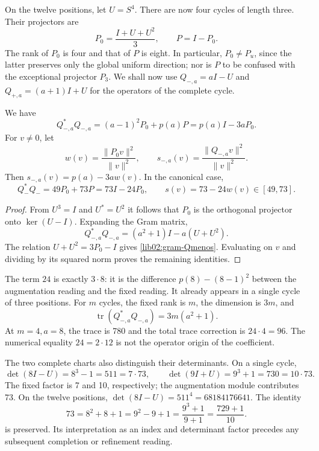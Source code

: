 On the twelve positions, let \(U=S^4\). There are now four cycles of length three. Their projectors are
\[
 P_0=\frac{I+U+U^2}{3},\qquad P=I-P_0.
\]
The rank of \(P_0\) is four and that of \(P\) is eight. In particular, \(P_0\ne P_u\), since the latter preserves only the global uniform direction; nor is \(P\) to be confused with the exceptional projector \(P_3\). We shall now use \(Q_{-,a}=aI-U\) and \(Q_{+,a}=(a+1)I+U\) for the operators of the complete cycle.

\begin{theorem}
\label{lib02:gram-ternario}
We have
\begin{equation}
 Q_{-,a}^*Q_{-,a}
 =(a-1)^2P_0+p(a)P=p(a)I-3aP_0.
 \label{lib02:gram-Qmenos}
\end{equation}
For \(v\ne0\), let
\[
 w(v)=\frac{\|P_0v\|^2}{\|v\|^2},\qquad
 s_{-,a}(v)=\frac{\|Q_{-,a}v\|^2}{\|v\|^2}.
\]
Then \(s_{-,a}(v)=p(a)-3aw(v)\). In the canonical case,
\begin{equation}
 Q_-^*Q_-=49P_0+73P=73I-24P_0,
 \qquad s(v)=73-24w(v)\in[49,73].
 \label{lib02:73-24w}
\end{equation}
\end{theorem}
\begin{proof}
From \(U^3=I\) and \(U^*=U^2\) it follows that \(P_0\) is the orthogonal projector onto \(\ker(U-I)\). Expanding the Gram matrix,
\[
 Q_{-,a}^*Q_{-,a}=(a^2+1)I-a(U+U^2).
\]
The relation \(U+U^2=3P_0-I\) gives \eqref{lib02:gram-Qmenos}. Evaluating on \(v\) and dividing by its squared norm proves the remaining identities.
\end{proof}

The term \(24\) is exactly \(3\cdot8\): it is the difference \(p(8)-(8-1)^2\) between the augmentation reading and the fixed reading. It already appears in a single cycle of three positions. For \(m\) cycles, the fixed rank is \(m\), the dimension is \(3m\), and
\[
 \operatorname{tr}(Q_{-,a}^*Q_{-,a})=3m(a^2+1).
\]
At \(m=4,a=8\), the trace is 780 and the total trace correction is \(24\cdot4=96\). The numerical equality \(24=2\cdot12\) is not the operator origin of the coefficient.

The two complete charts also distinguish their determinants. On a single cycle,
\[
 \det(8I-U)=8^3-1=511=7\cdot73,
 \qquad
 \det(9I+U)=9^3+1=730=10\cdot73.
\]
The fixed factor is 7 and 10, respectively; the augmentation module contributes 73. On the twelve positions, \(\det(8I-U)=511^4=68184176641\). The identity
\begin{equation}
 73=8^2+8+1=9^2-9+1=\frac{9^3+1}{9+1}
 =\frac{729+1}{10}.
 \label{lib02:completacion73}
\end{equation}
is preserved. Its interpretation as an index and determinant factor precedes any subsequent completion or refinement reading.

